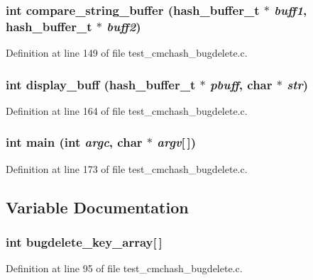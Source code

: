 \subsubsection[{compare\_\-string\_\-buffer}]{\setlength{\rightskip}{0pt plus 5cm}int compare\_\-string\_\-buffer (hash\_\-buffer\_\-t $\ast$ {\em buff1}, \/  hash\_\-buffer\_\-t $\ast$ {\em buff2})}\label{test__cmchash__bugdelete_8c_af183d0c5e0c482d0f02845db8a2f785c}


Definition at line 149 of file test\_\-cmchash\_\-bugdelete.c.
\subsubsection[{display\_\-buff}]{\setlength{\rightskip}{0pt plus 5cm}int display\_\-buff (hash\_\-buffer\_\-t $\ast$ {\em pbuff}, \/  char $\ast$ {\em str})}\label{test__cmchash__bugdelete_8c_ad9a0e7d500dc83e14095e7c90c40c5b9}


Definition at line 164 of file test\_\-cmchash\_\-bugdelete.c.
\subsubsection[{main}]{\setlength{\rightskip}{0pt plus 5cm}int main (int {\em argc}, \/  char $\ast$ {\em argv}[$\,$])}\label{test__cmchash__bugdelete_8c_a0ddf1224851353fc92bfbff6f499fa97}


Definition at line 173 of file test\_\-cmchash\_\-bugdelete.c.

\subsection{Variable Documentation}
\subsubsection[{bugdelete\_\-key\_\-array}]{\setlength{\rightskip}{0pt plus 5cm}int {\bf bugdelete\_\-key\_\-array}[$\,$]}\label{test__cmchash__bugdelete_8c_a426533f981565eb7df9f73106f74eec5}


Definition at line 95 of file test\_\-cmchash\_\-bugdelete.c.